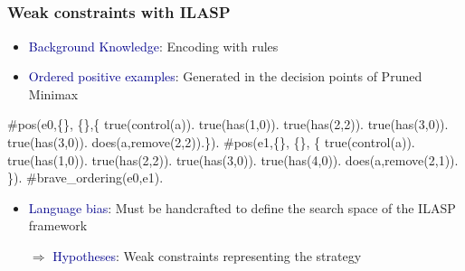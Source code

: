 \documentclass{beamer}
\newcommand\re[1]{\textcolor{darkblue}{#1}}
\begin{document}

\subsection{}
\begin{frame}[fragile]
  \frametitle{Weak constraints with ILASP}
  \footnotesize
  \begin{itemize}[<+->]
    \item \re{Background Knowledge}: Encoding with rules\\
    \item \re{Ordered positive examples}: Generated in the decision points of Pruned Minimax
  \end{itemize}
  \pause
  \begin{example}
    \begin{semiverbatim}
#pos(e0,\{\}, \{\},\{ 
  true(control(a)). true(has(1,0)). true(has(2,2)). 
  true(has(3,0)). true(has(3,0)). does(a,remove(2,2)).\}).
#pos(e1,\{\}, \{\}, \{
  true(control(a)). true(has(1,0)). true(has(2,2)).
  true(has(3,0)). true(has(4,0)). does(a,remove(2,1)). \}).      
#brave_ordering(e0,e1).    
  \end{semiverbatim}
  \end{example}
  \pause
  \begin{itemize}[<+->]
    \item \re{Language bias}: Must be handcrafted to define the search space of the ILASP framework\\
    \item[$\Longrightarrow$] \re{Hypotheses}: Weak constraints representing the strategy
  \end{itemize}
\end{frame}
\end{document}
